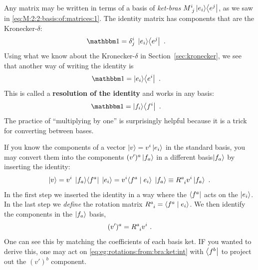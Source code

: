 \documentclass[12pt, oneside]{report}    %
\begin{document}
Any matrix may be written in terms of a basis of \emph{ket-bras} $M\aij{i}{j} \ket{e_i}\!\bra{e^j}$, as we saw in \eqref{eq:M:2:2:basis:of:matrices:1}. The identity matrix has components that are the Kronecker-$\delta$:
\begin{align}
    \one &= \delta^i_j \; \ket{e_i}\!\bra{e^j} \ .
\end{align}
Using what we know about the Kronecker-$\delta$ in Section~\ref{sec:kronecker}, we see that another way of writing the identity is
\begin{align}
    \one &= \ket{e_i}\!\bra{e^i} \ .
    \label{eq:resolution:of:the:identity}
\end{align}
This is called a \textbf{resolution of the identity} and works in any basis:
\begin{align}
    \one &= \ket{f_i}\!\bra{f^i} \ .
\end{align}
The practice of ``multiplying by one'' is surprisingly helpful because it is a trick for converting between bases.

\begin{example}\label{eg:rotations:from:bra:ket}
If you know the components of a vector $\left|v\right\rangle = v^i \left|e_i\right\rangle$ in the standard basis, you may convert them into the components $(v')^a \left|f_a\right\rangle$ in a different basis\sidenotemark $\left|f_a\right\rangle$ by inserting the identity:
\begin{align}
    \ket{v} = v^i\; \ket{f_a}\!\bra{f^a} \; \ket{e_i}
    = v^i \la f^a \mid e_i \ra \; \ket{f_a}
    \equiv R\aij{a}{i}v^i \ket{f_a} \ .
    \label{eq:eg:rotations:from:bra:ket:int}
\end{align}
In the first step we inserted the identity in a way where the $\left\langle f^a\right|$ acts on the $\left|e_i\right\rangle$. In the last step we \emph{define} the rotation matrix $R\aij{a}{i} = \la f^a \mid e_i \ra$. We then identify the components in the $\left|f_a\right\rangle$ basis,
\begin{align}
    (v')^a = R\aij{a}{i}v^i \ .
\end{align}
One can see this by matching the coefficients of each basis ket. IF you wanted to derive this, one may act on \eqref{eq:eg:rotations:from:bra:ket:int} with $\left\langle f^b\right|$ to project out the $(v')^b$ component.
\end{example}
\end{document}
